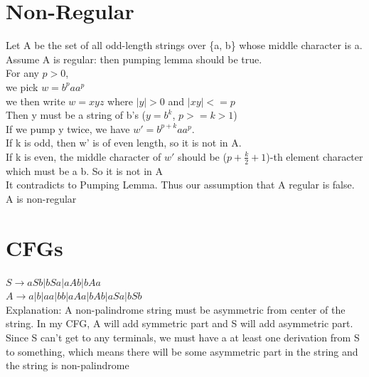 \documentclass[12pt]{article}
\begin{document}
\pagebreak


\section{Non-Regular}

Let A be the set of all odd-length strings over \{a, b\} whose middle character is a.
 Assume A is regular: then pumping lemma should be true.\\

For any $p >0$,\\
we pick $w = b^pa a^p $\\
we then write $w = xyz$ where $|y| > 0$ and  $ |xy| <= p$\\
Then y must be a string of b's ($y = b^k$, $ p >= k >1$)\\
If we pump y twice, we have $w' = b^{p+k}aa^p$.\\
If k is odd, then w' is of even length, so it is not in A.\\
If k is even, the middle character of $w'$ should be ($p+\frac{k}{2}+1$)-th element character which must be a b. So it is not in A\\
It contradicts to Pumping Lemma. Thus our assumption that A regular is false. A is non-regular




\pagebreak
\section{CFGs}
$S \rightarrow   aSb|bSa|aAb|bAa$\\
$A \rightarrow   a|b|aa|bb|aAa|bAb|aSa|bSb$\\

Explanation: A non-palindrome string must be asymmetric from center of the string. In my CFG, A will add symmetric part and S will add asymmetric part. Since S can't get to any terminals, we must have a at least one derivation from S to something, which means there will be some asymmetric part in the string and the string is non-palindrome
\end{document}
